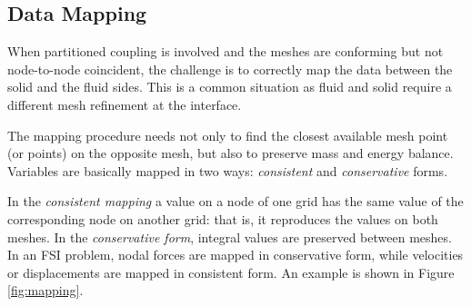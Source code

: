 \subsection{Data Mapping}
\label{sec:data-mapping}

When partitioned coupling is involved and the meshes are conforming but not node-to-node coincident, the challenge is to correctly map the data between the solid and the fluid sides. This is a common situation as fluid and solid require a different mesh refinement at the interface.

The mapping procedure needs not only to find the closest available mesh point (or points) on the opposite mesh, but also to preserve mass and energy balance. Variables are basically mapped in two ways: \textit{consistent} and \textit{conservative} forms.

In the \textit{consistent mapping} a value on a node of one grid has the same value of the corresponding node on another grid: that is, it reproduces the values on both meshes. In the \textit{conservative form}, integral values are preserved between meshes. In an FSI problem, nodal forces are mapped in conservative form, while velocities or displacements are mapped in consistent form. An example is shown in Figure \ref{fig:mapping}.



